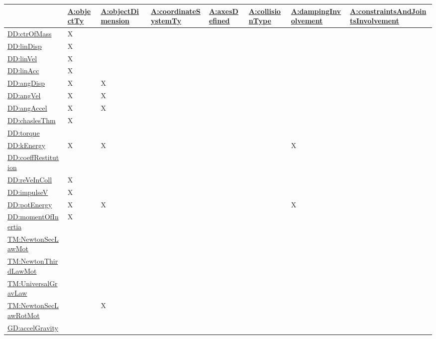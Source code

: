 \documentclass[12pt]{article}
\begin{document}
\begin{longtable}{l l l l l l l l}
\toprule
\textbf{} & \textbf{\hyperref[assumpOT]{A:objectTy}} & \textbf{\hyperref[assumpOD]{A:objectDimension}} & \textbf{\hyperref[assumpCST]{A:coordinateSystemTy}} & \textbf{\hyperref[assumpAD]{A:axesDefined}} & \textbf{\hyperref[assumpCT]{A:collisionType}} & \textbf{\hyperref[assumpDI]{A:dampingInvolvement}} & \textbf{\hyperref[assumpCAJI]{A:constraintsAndJointsInvolvement}}
\\
\midrule
\endhead
\hyperref[DD:ctrOfMass]{DD:ctrOfMass} & X &  &  &  &  &  & 
\\
\hyperref[DD:linDisp]{DD:linDisp} & X &  &  &  &  &  & 
\\
\hyperref[DD:linVel]{DD:linVel} & X &  &  &  &  &  & 
\\
\hyperref[DD:linAcc]{DD:linAcc} & X &  &  &  &  &  & 
\\
\hyperref[DD:angDisp]{DD:angDisp} & X & X &  &  &  &  & 
\\
\hyperref[DD:angVel]{DD:angVel} & X & X &  &  &  &  & 
\\
\hyperref[DD:angAccel]{DD:angAccel} & X & X &  &  &  &  & 
\\
\hyperref[DD:chaslesThm]{DD:chaslesThm} & X &  &  &  &  &  & 
\\
\hyperref[DD:torque]{DD:torque} &  &  &  &  &  &  & 
\\
\hyperref[DD:kEnergy]{DD:kEnergy} & X & X &  &  &  & X & 
\\
\hyperref[DD:coeffRestitution]{DD:coeffRestitution} &  &  &  &  &  &  & 
\\
\hyperref[DD:reVeInColl]{DD:reVeInColl} & X &  &  &  &  &  & 
\\
\hyperref[DD:impulseV]{DD:impulseV} & X &  &  &  &  &  & 
\\
\hyperref[DD:potEnergy]{DD:potEnergy} & X & X &  &  &  & X & 
\\
\hyperref[DD:momentOfInertia]{DD:momentOfInertia} & X &  &  &  &  &  & 
\\
\hyperref[TM:NewtonSecLawMot]{TM:NewtonSecLawMot} &  &  &  &  &  &  & 
\\
\hyperref[TM:NewtonThirdLawMot]{TM:NewtonThirdLawMot} &  &  &  &  &  &  & 
\\
\hyperref[TM:UniversalGravLaw]{TM:UniversalGravLaw} &  &  &  &  &  &  & 
\\
\hyperref[TM:NewtonSecLawRotMot]{TM:NewtonSecLawRotMot} &  & X &  &  &  &  & 
\\
\hyperref[GD:accelGravity]{GD:accelGravity} &  &  &  &  &  &  & 
\\

\end{longtable}
\end{document}
